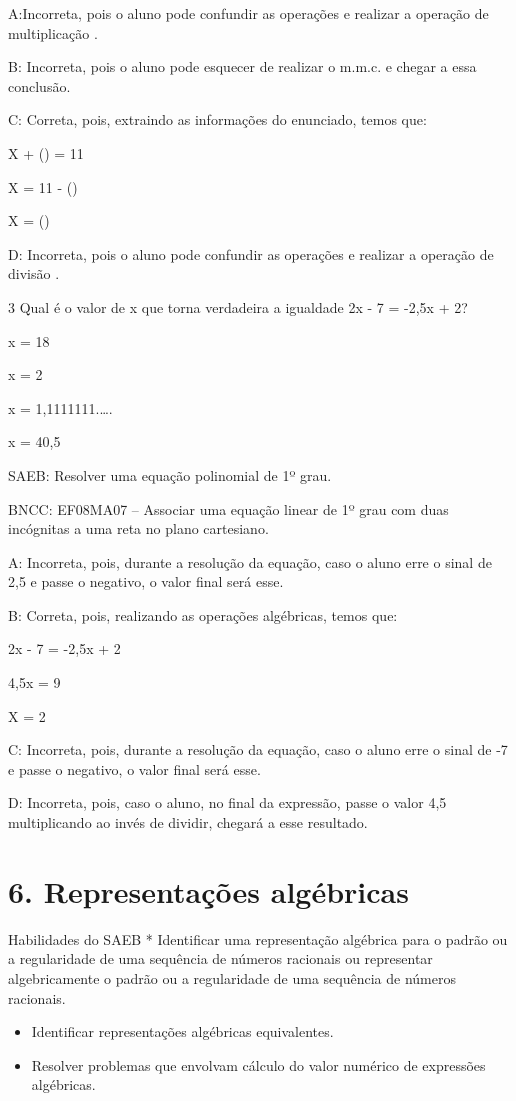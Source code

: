 {A:Incorreta, pois o aluno pode confundir as operações e realizar a
operação de multiplicação .

B: Incorreta, pois o aluno pode esquecer de realizar o m.m.c. e chegar a
essa conclusão.

C: Correta, pois, extraindo as informações do enunciado, temos que:

X + () = 11

X = 11 - ()

X = ()

D: Incorreta, pois o aluno pode confundir as operações e realizar a
operação de divisão .

\num{3} Qual é o valor de x que torna verdadeira a igualdade 2x - 7 = -2,5x +
2?
\item x = 18
\item x = 2
\item x = 1,1111111.\ldots.
\item x = 40,5

SAEB: Resolver uma equação polinomial de 1º grau.

BNCC: EF08MA07 -- Associar uma equação linear de 1º grau com duas
incógnitas a uma reta no plano cartesiano.

A: Incorreta, pois, durante a resolução da equação, caso o aluno erre o
sinal de 2,5 e passe o negativo, o valor final será esse.

B: Correta, pois, realizando as operações algébricas, temos que:

2x - 7 = -2,5x + 2

4,5x = 9

X = 2

C: Incorreta, pois, durante a resolução da equação, caso o aluno erre o
sinal de -7 e passe o negativo, o valor final será esse.

D: Incorreta, pois, caso o aluno, no final da expressão, passe o valor
4,5 multiplicando ao invés de dividir, chegará a esse resultado.


\section{6. Representações
algébricas}

Habilidades do SAEB * Identificar uma representação algébrica para o
padrão ou a regularidade de uma sequência de números racionais ou
representar algebricamente o padrão ou a regularidade de uma sequência
de números racionais.

\begin{itemize}
\item
  Identificar representações algébricas equivalentes.
\item
  Resolver problemas que envolvam cálculo do valor numérico de
  expressões algébricas.
\end{itemize}

}
